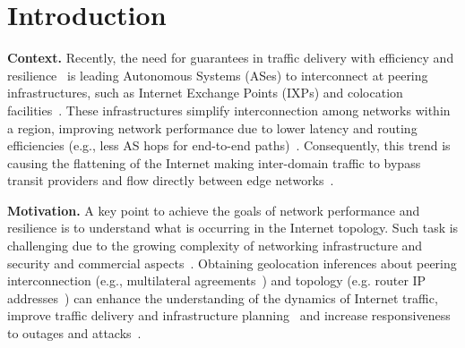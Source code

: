 \chapter{Introduction}\label{cap:introduction}
\thispagestyle{empty}

	\textbf{Context.} Recently, the need for guarantees in traffic delivery with efficiency and resilience~\cite{Yap:2017:TEO:3098822.3098854, Schlinker:2017:EEE:3098822.3098853, marcos:2018:dynamix} is leading Autonomous Systems (ASes) to interconnect at peering infrastructures, such as Internet Exchange Points (IXPs) and colocation facilities~\cite{Giotsas:2015:MPI:2716281.2836122}. These infrastructures simplify interconnection among networks within a region, improving network performance due to lower latency and routing efficiencies (e.g., less AS hops for end-to-end paths)~\cite{Chatzis:2013}. Consequently, this trend is causing the flattening of the Internet making inter-domain traffic to bypass transit providers and flow directly between edge networks~\cite{Labovitz:2010:IIT:1851182.1851194}.


	\textbf{Motivation.} A key point to achieve the goals of network performance and resilience is to understand what is occurring in the Internet topology. Such task is challenging due to the growing complexity of networking infrastructure and security and commercial aspects~\cite{Giotsas:2015:MPI:2716281.2836122}. Obtaining geolocation inferences about peering interconnection (e.g., multilateral agreements~\cite{Giotsas:2013}) and topology (e.g. router IP addresses~\cite{8002903,Huffaker:2014:DDR:2656877.2656879}) can enhance the understanding of the dynamics of Internet traffic, improve traffic delivery and infrastructure planning~\cite{Calder:2013:MEG:2504730.2504754} and increase responsiveness to outages and attacks~\cite{Giotsas:2017:DPI:3098822.3098855, marcos:2018:dynamix}. 

